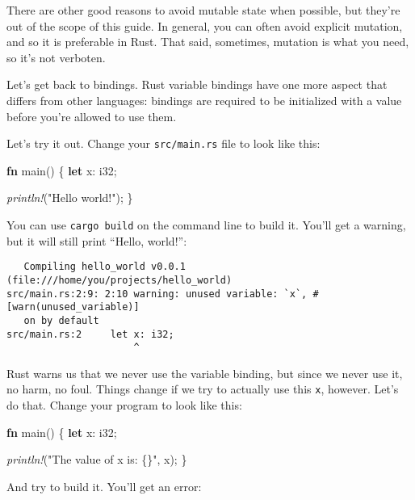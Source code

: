 \documentclass[a4paper,]{book}
\newenvironment{Shaded}{\begin{snugshade}}{\end{snugshade}}
\newcommand{\KeywordTok}[1]{\textcolor[rgb]{0.13,0.29,0.53}{\textbf{{#1}}}}
\newcommand{\DataTypeTok}[1]{\textcolor[rgb]{0.13,0.29,0.53}{{#1}}}
\newcommand{\StringTok}[1]{\textcolor[rgb]{0.31,0.60,0.02}{{#1}}}
\newcommand{\PreprocessorTok}[1]{\textcolor[rgb]{0.56,0.35,0.01}{\textit{{#1}}}}
\newcommand{\NormalTok}[1]{{#1}}
\begin{document}
There are other good reasons to avoid mutable state when possible, but
they're out of the scope of this guide. In general, you can often avoid
explicit mutation, and so it is preferable in Rust. That said,
sometimes, mutation is what you need, so it's not verboten.

Let's get back to bindings. Rust variable bindings have one more aspect
that differs from other languages: bindings are required to be
initialized with a value before you're allowed to use them.

Let's try it out. Change your \texttt{src/main.rs} file to look like
this:

\begin{Shaded}
\begin{Highlighting}[]
\KeywordTok{fn} \NormalTok{main() \{}
    \KeywordTok{let} \NormalTok{x: }\DataTypeTok{i32}\NormalTok{;}

    \PreprocessorTok{println!}\NormalTok{(}\StringTok{"Hello world!"}\NormalTok{);}
\NormalTok{\}}
\end{Highlighting}
\end{Shaded}

You can use \texttt{cargo\ build} on the command line to build it.
You'll get a warning, but it will still print ``Hello, world!'':

\begin{verbatim}
   Compiling hello_world v0.0.1 (file:///home/you/projects/hello_world)
src/main.rs:2:9: 2:10 warning: unused variable: `x`, #[warn(unused_variable)]
   on by default
src/main.rs:2     let x: i32;
                      ^
\end{verbatim}

Rust warns us that we never use the variable binding, but since we never
use it, no harm, no foul. Things change if we try to actually use this
\texttt{x}, however. Let's do that. Change your program to look like
this:

\begin{Shaded}
\begin{Highlighting}[]
\KeywordTok{fn} \NormalTok{main() \{}
    \KeywordTok{let} \NormalTok{x: }\DataTypeTok{i32}\NormalTok{;}

    \PreprocessorTok{println!}\NormalTok{(}\StringTok{"The value of x is: \{\}"}\NormalTok{, x);}
\NormalTok{\}}
\end{Highlighting}
\end{Shaded}

And try to build it. You'll get an error:
\end{document}
